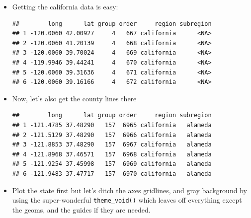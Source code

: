 \documentclass[]{book}
\newenvironment{Shaded}{\begin{snugshade}}{\end{snugshade}}
\newcommand{\KeywordTok}[1]{\textcolor[rgb]{0.13,0.29,0.53}{\textbf{{#1}}}}
\newcommand{\StringTok}[1]{\textcolor[rgb]{0.31,0.60,0.02}{{#1}}}
\newcommand{\NormalTok}[1]{{#1}}
\theoremstyle{definition}
\theoremstyle{definition}
\theoremstyle{remark}
\begin{document}
\begin{itemize}
\item
  Getting the california data is easy:

\begin{Shaded}
\end{Shaded}

\begin{verbatim}
##        long      lat group order     region subregion
## 1 -120.0060 42.00927     4   667 california      <NA>
## 2 -120.0060 41.20139     4   668 california      <NA>
## 3 -120.0060 39.70024     4   669 california      <NA>
## 4 -119.9946 39.44241     4   670 california      <NA>
## 5 -120.0060 39.31636     4   671 california      <NA>
## 6 -120.0060 39.16166     4   672 california      <NA>
\end{verbatim}
\item
  Now, let's also get the county lines there

\begin{Shaded}
\end{Shaded}

\begin{verbatim}
##        long      lat group order     region subregion
## 1 -121.4785 37.48290   157  6965 california   alameda
## 2 -121.5129 37.48290   157  6966 california   alameda
## 3 -121.8853 37.48290   157  6967 california   alameda
## 4 -121.8968 37.46571   157  6968 california   alameda
## 5 -121.9254 37.45998   157  6969 california   alameda
## 6 -121.9483 37.47717   157  6970 california   alameda
\end{verbatim}
\item
  Plot the state first but let's ditch the axes gridlines, and gray
  background by using the super-wonderful \texttt{theme\_void()} which
  leaves off everything except the geoms, and the guides if they are
  needed.


\end{itemize}
\end{document}
